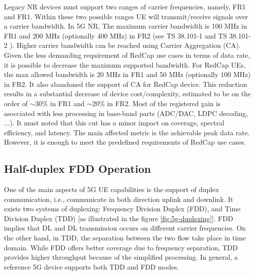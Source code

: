 \documentclass[conference]{IEEEtran}
\begin{document}
Legacy NR devices must support two ranges of carrier frequencies, namely, FR1 and FR1. Within these two possible ranges UE will transmit/receive signals over a carrier bandwidth. In 5G NR, The maximum carrier bandwidth is 100 MHz in FR1 and 200 MHz (optionally 400 MHz) in FR2 (see TS 38.101-1 \cite{3gpp_nr_nodate-2_38.101-1} and TS 38.101-2 \cite{3gpp.38.101-2}). Higher carrier bandwidth can be reached using Carrier Aggregation (CA).
Given the less demanding requirement of RedCap use cases in terms of data rate, it is possible to decrease the maximum supported bandwidth. For RedCap UEs, the max allowed bandwidth is 20 MHz in  FR1 and 50 MHz (optionally 100 MHz) in FR2. It also abandoned the support of CA for RedCap device.
This reduction results in a substantial decrease of device cost/complexity, estimated to be on the order of $\sim30\%$ in FR1 and $\sim20\%$ in  FR2. Most of the registered gain is asocciated with less processing in base-band parts (ADC/DAC, LDPC decoding, ...).
It must noted that this cut has a minor impact on coverage, spectral efficiency, and latency. The main affected metric is the achievable peak data rate. However, it is enough to meet the predefined requirements of RedCap use cases.

\subsection{Half-duplex FDD Operation}
\label{sec:4-3}


One of the main aspects of 5G UE capabilities is the support of duplex communication, i.e., communicate in both direction uplink and downlink. It exists two systems of duplexing: Frequency Division Duplex (FDD), and Time Division Duplex (TDD) [as illustrated in the figure \ref{fig:5g-duplexing}]. FDD implies that DL and DL transmission occurs on different carrier frequencies. On the other hand, in TDD, the separation between the two flow take place in time domain. 
 While FDD offers better coverage due to frequency separation, TDD provides higher throughput because of the simplified processing. In general, a reference 5G device supports both TDD and FDD modes.
 
\end{document}
